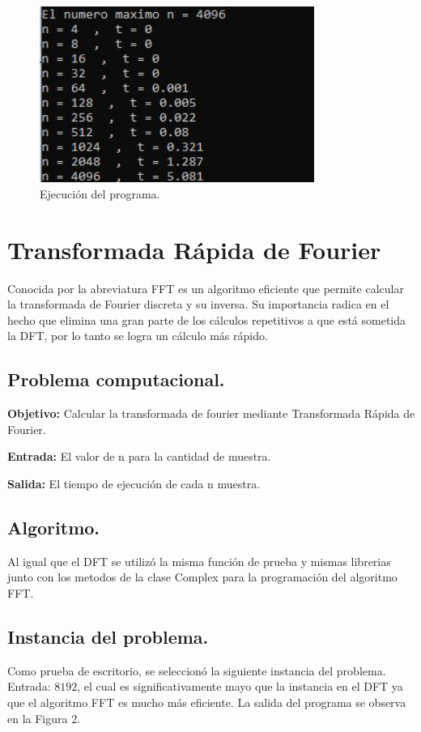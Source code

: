 \documentclass[12pt,letterpaper]{article}
\begin{document}
\begin{figure}[ht!]
  \centering
  \includegraphics[width=0.8\textwidth]{D}
  \caption{Ejecución del programa.}
  \label{fig:FFT_1d}
\end{figure}

\section{Transformada Rápida de Fourier}
Conocida por la abreviatura FFT es un algoritmo eficiente que permite calcular la transformada de Fourier discreta y su inversa. Su importancia radica en el hecho que elimina una gran parte de los c\'alculos repetitivos a que est\'a sometida la DFT, por lo tanto se logra un c\'alculo m\'as r\'apido.

\subsection{Problema computacional.}
\textbf{Objetivo:} Calcular la transformada de fourier mediante Transformada Rápida de Fourier.

\textbf{Entrada:} El valor de n para la cantidad de muestra.

\textbf{Salida:} El tiempo de ejecuci\'on de cada n muestra.

\subsection{Algoritmo.}
Al igual que el DFT se utiliz\'o la misma funci\'on de prueba y mismas librerias junto con los metodos de la clase Complex para la programaci\'on del algoritmo FFT.

\subsection{Instancia del problema.}
Como prueba de escritorio, se seleccion\'o la siguiente instancia del problema. Entrada: $8192$, el cual es significativamente mayo que la instancia en el DFT ya que el algoritmo FFT es mucho m\'as eficiente. La salida del programa se observa en la Figura 2. \\
\end{document}
